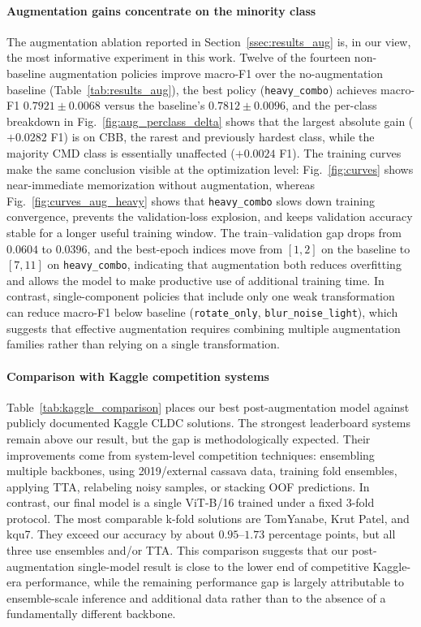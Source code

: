 \documentclass[conference]{IEEEtran}
\begin{document}
\paragraph{Augmentation gains concentrate on the minority class}
The augmentation ablation reported in Section~\ref{ssec:results_aug} is, in our view, the most informative experiment in this work. Twelve of the fourteen non-baseline augmentation policies improve macro-F1 over the no-augmentation baseline (Table~\ref{tab:results_aug}), the best policy (\texttt{heavy\_combo}) achieves macro-F1 $0.7921 \pm 0.0068$ versus the baseline's $0.7812 \pm 0.0096$, and the per-class breakdown in Fig.~\ref{fig:aug_perclass_delta} shows that the largest absolute gain ($+0.0282$ F1) is on CBB, the rarest and previously hardest class, while the majority CMD class is essentially unaffected ($+0.0024$ F1). The training curves make the same conclusion visible at the optimization level: Fig.~\ref{fig:curves} shows near-immediate memorization without augmentation, whereas Fig.~\ref{fig:curves_aug_heavy} shows that \texttt{heavy\_combo} slows down training convergence, prevents the validation-loss explosion, and keeps validation accuracy stable for a longer useful training window. The train--validation gap drops from $0.0604$ to $0.0396$, and the best-epoch indices move from $[1,2]$ on the baseline to $[7,11]$ on \texttt{heavy\_combo}, indicating that augmentation both reduces overfitting and allows the model to make productive use of additional training time. In contrast, single-component policies that include only one weak transformation can reduce macro-F1 below baseline (\texttt{rotate\_only}, \texttt{blur\_noise\_light}), which suggests that effective augmentation requires combining multiple augmentation families rather than relying on a single transformation.

\paragraph{Comparison with Kaggle competition systems}
Table~\ref{tab:kaggle_comparison} places our best post-augmentation model against publicly documented Kaggle CLDC solutions. The strongest leaderboard systems remain above our result, but the gap is methodologically expected. Their improvements come from system-level competition techniques: ensembling multiple backbones, using 2019/external cassava data, training fold ensembles, applying TTA, relabeling noisy samples, or stacking OOF predictions. In contrast, our final model is a single ViT-B/16 trained under a fixed 3-fold protocol. The most comparable k-fold solutions are TomYanabe, Krut Patel, and kqu7. They exceed our accuracy by about $0.95$--$1.73$ percentage points, but all three use ensembles and/or TTA. This comparison suggests that our post-augmentation single-model result is close to the lower end of competitive Kaggle-era performance, while the remaining performance gap is largely attributable to ensemble-scale inference and additional data rather than to the absence of a fundamentally different backbone.
\end{document}
